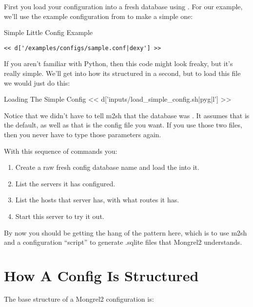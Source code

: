 First you load your configuration into a fresh database using .  For our example, we'll use the example configuration from
 to make a simple one:

\begin{code}{Simple Little Config Example}
\begin{lstlisting}
<< d['/examples/configs/sample.conf|dexy'] >>
\end{lstlisting}
\end{code}

If you aren't familiar with Python, then this code might look freaky, but it's really
simple.  We'll get into how its structured in a second, but to load this file
we would just do this:

\begin{code}{Loading The Simple Config}
<< d['inputs/load_simple_config.sh|pyg|l'] >>
\end{code}

Notice that we didn't have to tell m2sh that the database was .
It assumes that is the default, as well as that  is the config
file you want.  If you use those two files, then you never have to type those
parameters again.

With this sequence of commands you:

\begin{enumerate}
\item Create a raw fresh config database name  and load the  into it.
\item List the servers it has configured.
\item List the hosts that server has, with what routes it has.
\item Start this server to try it out.
\end{enumerate}

By now you should be getting the hang of the pattern here, which is to use
m2sh and a configuration ``script'' to generate .sqlite files
that Mongrel2 understands.

\section{How A Config Is Structured}

The base structure of a Mongrel2 configuration is:

